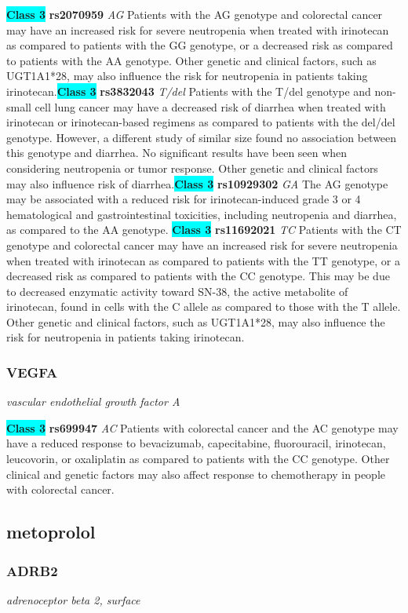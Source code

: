 \documentclass{report}
\begin{document}
\textbf{\colorbox{cyan} {Class 3}} \textbf{ rs2070959 } \textit{ AG }
Patients with the AG genotype and colorectal cancer may have an increased risk for severe neutropenia when treated with irinotecan as compared to patients with the GG genotype, or a decreased risk as compared to patients with the AA genotype. Other genetic and clinical factors, such as UGT1A1*28, may also influence the risk for neutropenia in patients taking irinotecan.\newline\textbf{\colorbox{cyan} {Class 3}} \textbf{ rs3832043 } \textit{ T/del }
Patients with the T/del genotype and non-small cell lung cancer may have a decreased risk of diarrhea when treated with irinotecan or irinotecan-based regimens as compared to patients with the del/del genotype. However, a different study of similar size found no association between this genotype and diarrhea. No significant results have been seen when considering neutropenia or tumor response. Other genetic and clinical factors may also influence risk of diarrhea.\newline\textbf{\colorbox{cyan} {Class 3}} \textbf{ rs10929302 } \textit{ GA }
The AG genotype may be associated with a reduced risk for irinotecan-induced grade 3 or 4 hematological and gastrointestinal toxicities, including neutropenia and diarrhea, as compared to the AA genotype. \newline\textbf{\colorbox{cyan} {Class 3}} \textbf{ rs11692021 } \textit{ TC }
Patients with the CT genotype and colorectal cancer may have an increased risk for severe neutropenia when treated with irinotecan as compared to patients with the TT genotype, or a decreased risk as compared to patients with the CC genotype. This may be due to decreased enzymatic activity toward SN-38, the active metabolite of irinotecan, found in cells with the C allele as compared to those with the T allele. Other genetic and clinical factors, such as UGT1A1*28, may also influence the risk for neutropenia in patients taking irinotecan.\newline\subsubsection{ VEGFA }
\textit{ vascular endothelial growth factor A }

\textbf{\colorbox{cyan} {Class 3}} \textbf{ rs699947 } \textit{ AC }
Patients with colorectal cancer and the AC genotype may have a reduced response to bevacizumab, capecitabine, fluorouracil, irinotecan, leucovorin, or oxaliplatin as compared to patients with the CC genotype. Other clinical and genetic factors may also affect response to chemotherapy in people with colorectal cancer.\newline\subsection{ metoprolol }\subsubsection{ ADRB2 }
\textit{ adrenoceptor beta 2, surface }
\end{document}
